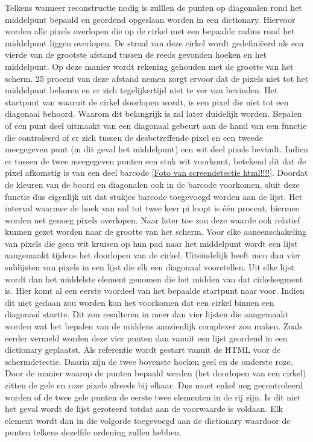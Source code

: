 		Telkens wanneer reconstructie nodig is zulllen de punten op diagonalen rond het middelpunt bepaald en geordend opgeslaan worden in een dictionary. Hiervoor worden alle pixels overlopen die op de cirkel met een bepaalde radius rond het middelpunt liggen overlopen. De straal van deze cirkel wordt gedefiniëerd als een vierde van de grootste afstand tussen de reeds gevonden hoeken en het middelpunt. Op deze manier wordt rekening gehouden met de grootte van het scherm. 25 procent van deze afstand nemen zorgt ervoor dat de pixels niet tot het middelpunt behoren en er zich tegelijkertijd niet te ver van bevinden. Het startpunt van waaruit de cirkel doorlopen wordt, is een pixel die niet tot een diagonaal behoord. Waarom dit belangrijk is zal later duidelijk worden. Bepalen of een punt deel uitmaakt van een diagonaal gebeurt aan de hand van een functie die controleerd of er zich tussen de desbetreffende pixel en een tweede meegegeven punt (in dit geval het middelpunt) een wit deel pixels bevindt. Indien er tussen de twee meegegeven punten een stuk wit voorkomt, betekend dit dat de pixel afkomstig is van een deel barcode \ref{Foto van screendetectie html!!!!}.
		Doordat de kleuren van de boord en diagonalen ook in de barcode voorkomen, sluit deze functie dus eigenlijk uit dat stukjes barcode toegevoegd worden aan de lijst. Het interval waarmee de hoek van nul tot twee keer pi loopt is één procent, hiermee worden net genoeg pixels overlopen. Naar later toe zou deze waarde ook relatief kunnen gezet worden naar de grootte van het scherm. Voor elke aaneenschakeling van pixels die geen wit kruisen op hun pad naar het middelpunt wordt een lijst aangemaakt tijdens het doorlopen van de cirkel. Uiteindelijk heeft men dan vier sublijsten van pixels in een lijst die elk een diagonaal voorstellen. Uit elke lijst wordt dan het middelste element genomen die het midden van dat cirkelsegment is. Hier komt al een eerste voordeel van het bepaalde startpunt naar voor. Indien dit niet gedaan zou worden kon het voorkomen dat een cirkel binnen een diagonaal startte. Dit zou resulteren in meer dan vier lijsten die aangemaakt worden wat het bepalen van de middens aanzienlijk complexer zou maken. Zoals eerder vermeld worden deze vier punten dan vanuit een lijst geordend in een dictionary geplaatst. Als referentie wordt gestart vanuit de HTML voor de schermdetectie. Daarin zijn de twee bovenste hoeken geel en de onderste roze. Door de manier waarop de punten bepaald werden (het doorlopen van een cirkel) zitten de gele en roze pixels alreeds bij elkaar. Dus moet enkel nog gecontroleerd worden of de twee gele punten de eerste twee elementen in de rij zijn. Is dit niet het geval wordt de lijst geroteerd totdat aan de voorwaarde is voldaan. Elk element wordt dan in die volgorde toegevoegd aan de dictionary waardoor de punten telkens dezelfde ordening zullen hebben.
		
